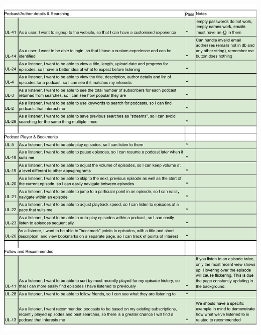 \documentclass[../report.tex]{subfiles}
\begin{document}
\begin{center}
    \includegraphics[width=1.1\textwidth,page=2]{resources/testing_tables}
\end{center}
\end{document}
